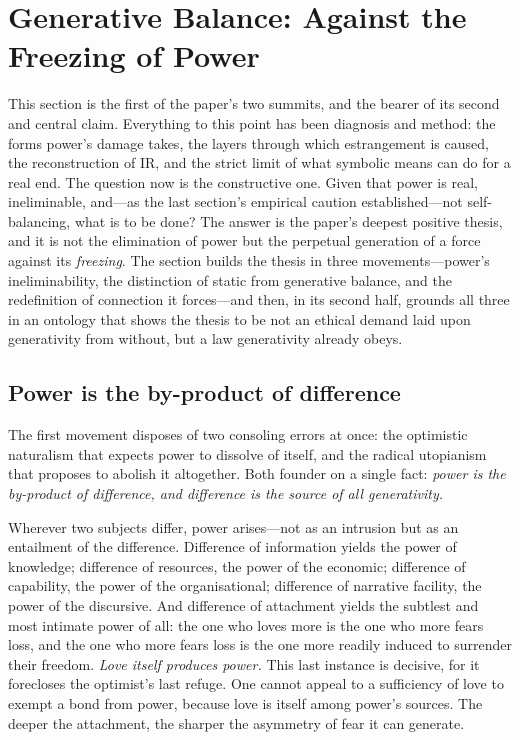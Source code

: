 \section{Generative Balance: Against the Freezing of Power}
\label{p17:sec:balance}

\noindent
This section is the first of the paper's two summits, and the bearer of its second and central claim. Everything to this point has been diagnosis and method: the forms power's damage takes, the layers through which estrangement is caused, the reconstruction of IR, and the strict limit of what symbolic means can do for a real end. The question now is the constructive one. Given that power is real, ineliminable, and---as the last section's empirical caution established---not self-balancing, what is to be done? The answer is the paper's deepest positive thesis, and it is not the elimination of power but the perpetual generation of a force against its \emph{freezing}. The section builds the thesis in three movements---power's ineliminability, the distinction of static from generative balance, and the redefinition of connection it forces---and then, in its second half, grounds all three in an ontology that shows the thesis to be not an ethical demand laid upon generativity from without, but a law generativity already obeys.

\subsection{Power is the by-product of difference}
\label{p17:sub:balance-difference}

The first movement disposes of two consoling errors at once: the optimistic naturalism that expects power to dissolve of itself, and the radical utopianism that proposes to abolish it altogether. Both founder on a single fact: \emph{power is the by-product of difference, and difference is the source of all generativity.}

Wherever two subjects differ, power arises---not as an intrusion but as an entailment of the difference. Difference of information yields the power of knowledge; difference of resources, the power of the economic; difference of capability, the power of the organisational; difference of narrative facility, the power of the discursive. And difference of attachment yields the subtlest and most intimate power of all: the one who loves more is the one who more fears loss, and the one who more fears loss is the one more readily induced to surrender their freedom. \emph{Love itself produces power.} This last instance is decisive, for it forecloses the optimist's last refuge. One cannot appeal to a sufficiency of love to exempt a bond from power, because love is itself among power's sources. The deeper the attachment, the sharper the asymmetry of fear it can generate.

